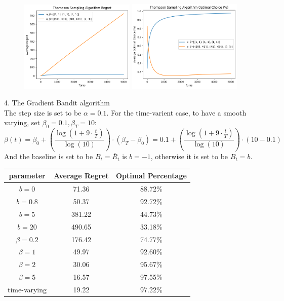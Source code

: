 \newpage
\begin{figure}[h]
    \centering
    \includegraphics[width=0.49\textwidth]{./figure/TS_regret.png}
    \includegraphics[width=0.49\textwidth]{./figure/TS_optimal.png}
\end{figure}

4. The Gradient Bandit algorithm \\
The step size is set to be $\alpha=0.1$. For the time-varient case, to have a smooth varying, set $\beta_0=0.1, \beta_T=10$:
$$\beta(t) = \beta_0 + \left( \frac{\log\left(1 + 9 \cdot \frac{t}{T} \right)}{\log(10)} \right) \cdot (\beta_T - \beta_0) = 0.1 + \left( \frac{\log\left(1 + 9 \cdot \frac{t}{T} \right)}{\log(10)} \right) \cdot (10 - 0.1)$$
And the baseline is set to be $B_t=\bar{R}_t$ is $b=-1$, otherwise it is set to be $B_t=b$.
\begin{table}[h]
    \centering
    \begin{tabular}{c c c}
    \toprule
    parameter & Average Regret & Optimal Percentage \\
    \midrule
    $b=0$   & 71.36  & 88.72\% \\
    $b=0.8$ & 50.37  & 92.72\% \\
    $b=5$   & 381.22 & 44.73\% \\
    $b=20$  & 490.65 & 33.18\% \\
    \midrule
    $\beta=0.2$ & 176.42 & 74.77\% \\
    $\beta=1$   & 49.97  & 92.60\% \\
    $\beta=2$   & 30.06  & 95.67\% \\
    $\beta=5$   & 16.57  & 97.55\% \\
    \midrule
    time-varying & 19.22 & 97.22\% \\
    \bottomrule
\end{tabular}
\vspace{-0.5cm}
\end{table}

